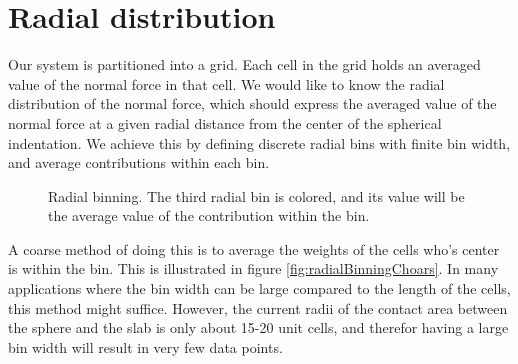 \documentclass[twoside,english]{uiofysmaster}
\begin{document}




\section{Radial distribution}
Our system is partitioned into a grid. 
Each cell in the grid holds an averaged value of the normal force in that cell. 
We would like to know the radial distribution of the normal force, which should express the averaged value of the normal force at a given radial distance from the center of the spherical indentation.
We achieve this by defining discrete radial bins with finite bin width, and average contributions within each bin.
\begin{figure}
	\centering
	\resizebox{0.5\linewidth}{!}{
		
	}
	\caption{Radial binning. The third radial bin is colored, and its value will be the average value of the contribution within the bin.}%
	\label{fig:radialBinningSmooth}
\end{figure}
A coarse method of doing this is to average the weights of the cells who's center is within the bin. 
This is illustrated in figure \ref{fig:radialBinningChoars}. 
In many applications where the bin width can be large compared to the length of the cells, this method might suffice.
However, the current radii of the contact area between the sphere and the slab is only about 15-20 unit cells, and therefor having a large bin width will result in very few data points. 
\end{document}
